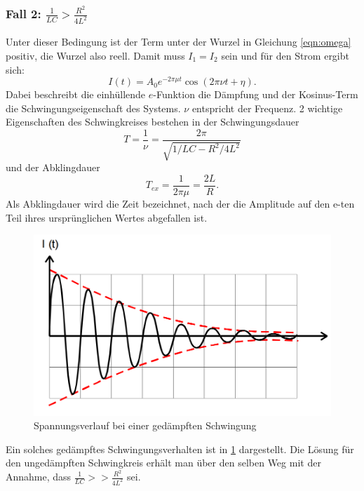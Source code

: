 \subsubsection{Fall 2: $\frac{1}{LC}>\frac{R^2}{4L^2}$}
Unter dieser Bedingung ist der Term unter der Wurzel in Gleichung
\ref{eqn:omega} positiv,
die Wurzel also reell. Damit muss $I_1 = I_2$ sein und für den Strom ergibt
sich:
\begin{equation}
  I(t) = A_0e^{-2\pi \mu t}\cos{(2\pi \nu t + \eta)}.
  \label{eqn:Ischwingung}
\end{equation}
Dabei beschreibt die einhüllende $e$-Funktion die Dämpfung und der
Kosinus-Term die Schwingungseigenschaft des Systems. $\nu$ entspricht der
Frequenz.
2 wichtige Eigenschaften des Schwingkreises bestehen in der Schwingungsdauer
\begin{equation}
  T =\frac{1}{\nu} = \frac{2\pi}{\sqrt{1/LC - R^2/4L^2}}
\end{equation}
und der Abklingdauer
\begin{equation}
  T_{ex} = \frac{1}{2\pi\mu} = \frac{2L}{R}.
\end{equation}
Als Abklingdauer wird die Zeit bezeichnet, nach der die Amplitude auf den e-ten
Teil ihres ursprünglichen Wertes abgefallen ist.

\begin{figure}
  \centering
  \includegraphics[width=\textwidth]{gedschwingung.png}
  \caption{Spannungsverlauf bei einer gedämpften Schwingung}
  \label{fig:gedschw}
\end{figure}
Ein solches gedämpftes Schwingungsverhalten ist in \ref{fig:gedschw} dargestellt.
Die Lösung für den ungedämpften Schwingkreis erhält man über den selben Weg mit
der Annahme, dass $\frac{1}{LC} >> \frac{R^2}{4L^2}$ sei.

